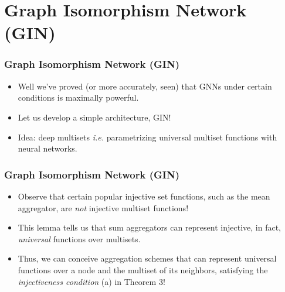 \documentclass[handout]{beamer}
\begin{document}

\section{Graph Isomorphism Network (GIN)}

\begin{frame}
\frametitle{Graph Isomorphism Network (GIN)}

\begin{itemize}
	\item Well we've proved (or more accurately, seen) that GNNs under certain conditions is maximally powerful. \pause
	
	\item Let us develop a simple architecture, GIN! \pause
	
	\item Idea: \alert{deep multisets} {\it i.e.} parametrizing universal multiset functions with neural networks.

\end{itemize}


\end{frame}

\begin{frame}
\frametitle{Graph Isomorphism Network (GIN)}

\begin{itemize}
\begin{block}{Lemma 5}
Assume $\mathcal{X}$ is countable.
There exists a function $f : \mathcal{X} \rightarrow \mathbb{R}^n$ so that $h(X) = \sum_{x \in X} f(x)$ is unique for each multiset $X \subset \mathcal{X}$ of bounded size.

Moreover, any multiset function $g$ can be decomposed as $g(X) = \phi \left( \sum_{x \in X} f(x) \right)$ for some function $\phi$.
\end{block} \pause

	\item Observe that certain popular injective set functions, such as the mean aggregator, are {\it not} injective multiset functions! \pause
	
	\item This lemma tells us that sum aggregators can represent injective, in fact, {\it universal} functions over multisets. \pause
	
	\item Thus, we can conceive aggregation schemes that can \alert{represent universal functions over a node and the multiset of its neighbors}, satisfying the {\it injectiveness condition} (a) in Theorem 3!

\end{itemize}


\end{frame}
\end{document}
